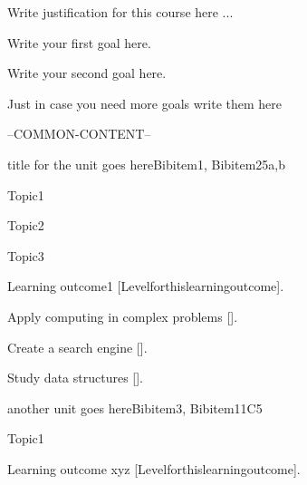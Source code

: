 \begin{syllabus}


\begin{justification}
Write justification for this course here ...
\end{justification}

\begin{goals}
\item Write your first goal here.
\item Write your second goal here.
\item Just in case you need more goals write them here
\end{goals}

--COMMON-CONTENT--

\begin{unit}{title for the unit goes here}{}{Bibitem1, Bibitem2}{5}{a,b}
\begin{topics}
      \item Topic1
      \item Topic2
      \item Topic3
\end{topics}

\begin{learningoutcomes}
   \item Learning outcome1 [Levelforthislearningoutcome].
   \item Apply computing in complex problems [\Usage].
   \item Create a search engine [\Assessment].
   \item Study data structures [\Familiarity].
\end{learningoutcomes}
\end{unit}

\begin{unit}{another unit goes here}{}{Bibitem3, Bibitem1}{1}{C5}
\begin{topics}
      \item Topic1
\end{topics}

\begin{learningoutcomes}
      \item Learning outcome xyz [Levelforthislearningoutcome].
\end{learningoutcomes}
\end{unit}

\begin{coursebibliography}
\end{coursebibliography}

\end{syllabus}
